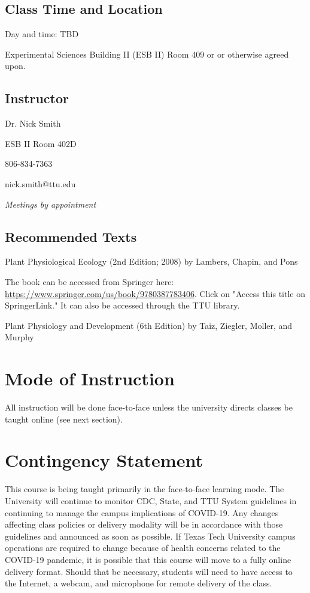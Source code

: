 \documentclass[12pt, notitlepage]{article}   	%
\begin{document}
{\subsection{Class Time and Location}
Day and time: TBD

Experimental Sciences Building II (ESB II) Room 409 or 
or otherwise agreed upon.

\subsection{Instructor}
Dr. Nick Smith \par
ESB II Room 402D \par
806-834-7363 \par
nick.smith@ttu.edu \par
\textit{Meetings by appointment}

\subsection{Recommended Texts}
Plant Physiological Ecology (2nd Edition; 2008) by Lambers, Chapin, and Pons \par
The book can be accessed from Springer here: 
\url{https://www.springer.com/us/book/9780387783406}. Click on "Access this title on 
SpringerLink." It can also be accessed through the TTU library. \par
Plant Physiology and Development (6th Edition) by Taiz, Ziegler, Moller, and Murphy

\section{Mode of Instruction}
All instruction will be done face-to-face unless the university directs classes be 
taught online (see next section).

\section{Contingency Statement}
This course is being taught primarily in the face-to-face learning mode. 
The University will continue to monitor CDC, State, and TTU System guidelines in 
continuing to manage the campus implications of COVID-19. 
Any changes affecting class policies or delivery modality will be in accordance with 
those guidelines and announced as soon as possible. 
If Texas Tech University campus operations are required to change because of health 
concerns related to the COVID-19 pandemic, it is possible that this course will move 
to a fully online delivery format. 
Should that be necessary, students will need to have access to the Internet, a webcam, 
and microphone for remote delivery of the class. 

}
\end{document}
